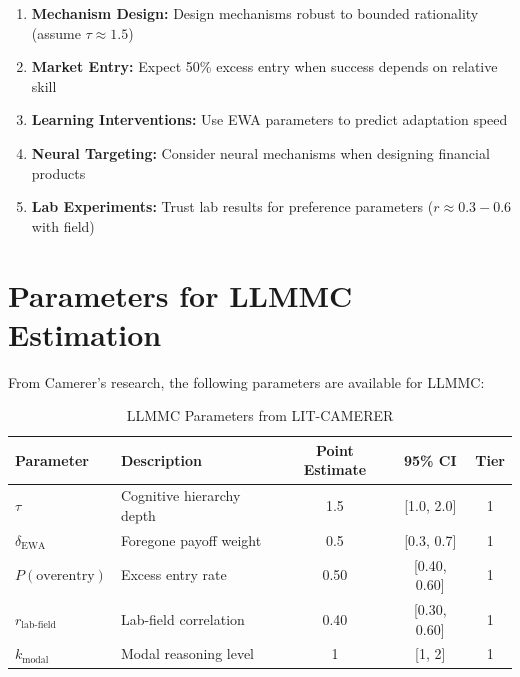 \begin{tcolorbox}[colback=green!5!white, colframe=green!75!black,
    title=Practical Implications]
\begin{enumerate}
\item \textbf{Mechanism Design:} Design mechanisms robust to bounded rationality (assume $\tau \approx 1.5$)
\item \textbf{Market Entry:} Expect 50\% excess entry when success depends on relative skill
\item \textbf{Learning Interventions:} Use EWA parameters to predict adaptation speed
\item \textbf{Neural Targeting:} Consider neural mechanisms when designing financial products
\item \textbf{Lab Experiments:} Trust lab results for preference parameters ($r \approx 0.3-0.6$ with field)
\end{enumerate}
\end{tcolorbox}


\section{Parameters for LLMMC Estimation}
\label{sec:ca-llmmc}

From Camerer's research, the following parameters are available for LLMMC:

\begin{table}[htbp]
\centering
\caption{LLMMC Parameters from LIT-CAMERER}
\label{tab:ca-llmmc}
\renewcommand{\arraystretch}{1.3}
\begin{tabular}{@{}llccc@{}}
\toprule
\textbf{Parameter} & \textbf{Description} & \textbf{Point Estimate} & \textbf{95\% CI} & \textbf{Tier} \\
\midrule
$\tau$ & Cognitive hierarchy depth & 1.5 & [1.0, 2.0] & 1 \\
$\delta_{\text{EWA}}$ & Foregone payoff weight & 0.5 & [0.3, 0.7] & 1 \\
$P(\text{overentry})$ & Excess entry rate & 0.50 & [0.40, 0.60] & 1 \\
$r_{\text{lab-field}}$ & Lab-field correlation & 0.40 & [0.30, 0.60] & 1 \\
$k_{\text{modal}}$ & Modal reasoning level & 1 & [1, 2] & 1 \\
\bottomrule
\end{tabular}
\end{table}


